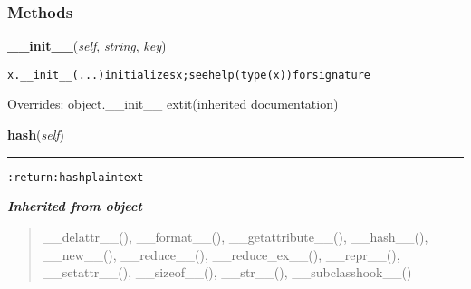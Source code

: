   \subsubsection{Methods}

    \vspace{0.5ex}

\hspace{.8\funcindent}\begin{boxedminipage}{\funcwidth}

    \raggedright \textbf{\_\_init\_\_}(\textit{self}, \textit{string}, \textit{key})

\setlength{\parskip}{2ex}
\begin{alltt}
x.\_\_init\_\_(...) initializes x; see help(type(x)) for signature
\end{alltt}

\setlength{\parskip}{1ex}
      Overrides: object.\_\_init\_\_ 	extit{(inherited documentation)}

    \end{boxedminipage}

    \label{hal:maths:crypt:AES:hash}

    \vspace{0.5ex}

\hspace{.8\funcindent}\begin{boxedminipage}{\funcwidth}

    \raggedright \textbf{hash}(\textit{self})

    \vspace{-1.5ex}

    \rule{\textwidth}{0.5\fboxrule}
\setlength{\parskip}{2ex}
\begin{alltt}

:return: hash plaintext
\end{alltt}

\setlength{\parskip}{1ex}
    \end{boxedminipage}


\large{\textbf{\textit{Inherited from object}}}

\begin{quote}
\_\_delattr\_\_(), \_\_format\_\_(), \_\_getattribute\_\_(), \_\_hash\_\_(), \_\_new\_\_(), \_\_reduce\_\_(), \_\_reduce\_ex\_\_(), \_\_repr\_\_(), \_\_setattr\_\_(), \_\_sizeof\_\_(), \_\_str\_\_(), \_\_subclasshook\_\_()
\end{quote}

